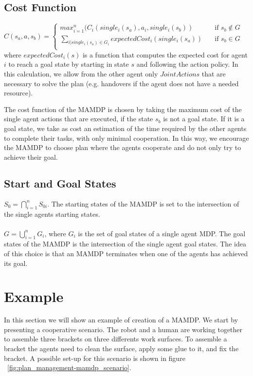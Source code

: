\subsection{Cost Function}
$C(s_a,a,s_b)= 
	\begin{cases}
		max_{i=1}^{n}(C_i(single_i(s_a),a_i,single_i(s_b))  & \quad \text{if } s_b \not\in G \\
		\sum_{i | single_i(s_a) \in G_i} expectedCost_i(single_i(s_a))  & \quad \text{if } s_b \in  G
		\\
	\end{cases} $	\\

where $expectedCost_i(s)$ is a function that computes the expected cost for agent $i$ to reach a goal state by starting in state $s$ and following the action policy. In this calculation, we allow from the other agent only $JointActions$ that are necessary to solve the plan (e.g. handovers if the agent does not have a needed resource).

The cost function of the MAMDP is chosen by taking the maximum cost of the single agent actions that are executed, if the state $s_b$ is not a goal state. If it is a goal state, we take as cost an estimation of the time required by the other agents to complete their tasks, with only minimal cooperation. In this way, we encourage the MAMDP to choose plan where the agents cooperate and do not only try to achieve their goal.

\subsection{Start and Goal States}
$S_0=\bigcap_{i=1}^n S_{0i}$. The starting states of the MAMDP is set to the intersection of the single agents starting states.\\\\$G=\bigcup_{i=1}^n G_i $, where $G_i$ is the set of goal states of a single agent MDP. The goal states of the MAMDP is the intersection of the single agent goal states. The idea of this choice is that an MAMDP terminates when one of the agents has achieved its goal. 

\section{Example}
In this section we will show an example of creation of a MAMDP. We start by presenting a cooperative scenario. The robot and a human are working together to assemble three brackets on three differents work surfaces. To assemble a bracket the agents need to clean the surface, apply some glue to it, and fix the bracket. A possible set-up for this scenario is shown in figure ~\ref{fig:plan_management-mamdp_scenario}.

